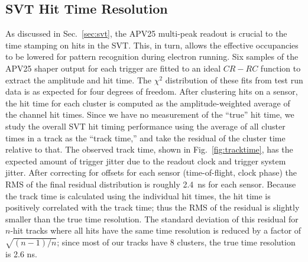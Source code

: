 \subsection*{SVT Hit Time Resolution}
As discussed in Sec.~\ref{sec:svt}, the APV25 multi-peak readout is crucial to the time stamping on hits
in the SVT. This, in turn, allows the effective occupancies to be lowered for pattern recognition
during electron running. 
Six samples of the APV25 shaper output for each trigger are fitted to an ideal $CR-RC$ function to 
extract the amplitude and hit time.  The $\chi^2$ distribution of these fits from test run data is as expected
for four degrees of freedom.
After clustering hits on a sensor, the hit time for each cluster is computed as the 
amplitude-weighted average of the channel hit times. Since we have no measurement of the ``true'' hit time, we study the overall SVT hit 
timing performance using the average of all cluster times in a track as the ``track time,'' and take the
 residual of the cluster time relative to that. The observed track time, shown in Fig.~\ref{fig:tracktime}, has the expected amount of trigger jitter due to the readout clock and trigger system jitter. After correcting for offsets for each sensor (time-of-flight, clock phase) the RMS 
 of the final residual distribution is roughly 2.4~ns for each sensor. 
Because the track time is calculated using the individual hit times, the hit time is positively correlated 
with the track time; thus the RMS of the residual is slightly smaller than the true time resolution.
The standard deviation of this residual for $n$-hit tracks where all hits have the same time resolution 
is reduced by a factor of $\sqrt{(n-1)/n}$; since most of our tracks have 8 clusters, the true time 
resolution is 2.6 ns. 
